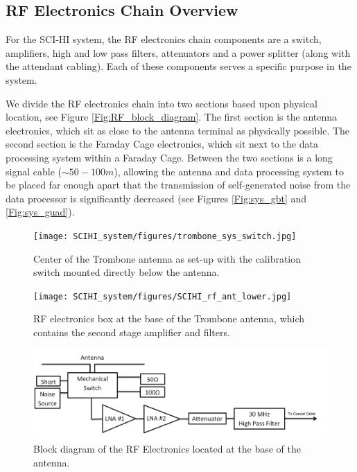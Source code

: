 \subsection{RF Electronics Chain Overview}

For the SCI-HI system, the RF electronics chain components are a switch, amplifiers, high and low pass filters, attenuators and a power splitter (along with the attendant cabling). Each of these components serves a specific purpose in the system. 

We divide the RF electronics chain into two sections based upon physical location, see Figure \ref{Fig:RF_block_diagram}. The first section is the antenna electronics, which sit as close to the antenna terminal as physically possible. The second section is the Faraday Cage electronics, which sit next to the data processing system within a Faraday Cage. Between the two sections is a long signal cable ($\sim50-100 m$), allowing the antenna and data processing system to be placed far enough apart that the transmission of self-generated noise from the data processor is significantly decreased (see Figures \ref{Fig:sys_gbt} and \ref{Fig:sys_guad}).

\begin{figure}[htb]
\centering
\begin{minipage}[b]{0.47\textwidth}
\centering
\texttt{[image: SCIHI\_system/figures/trombone\_sys\_switch.jpg]}
\caption{Center of the Trombone antenna as set-up with the calibration switch mounted directly below the antenna.}
\label{Fig:trombone_switch}
\end{minipage}%
\begin{minipage}[b]{0.02\textwidth}
\hspace{1cm}
\end{minipage}%
\begin{minipage}[b]{0.47\textwidth}
\centering
\texttt{[image: SCIHI\_system/figures/SCIHI\_rf\_ant\_lower.jpg]}
\caption{RF electronics box at the base of the Trombone antenna, which contains the second stage amplifier and filters.}
\label{Fig:trombone_base}
\end{minipage}
\end{figure}

\begin{figure}[htb]
\begin{center}
\includegraphics[width=0.9\linewidth]{SCIHI_system/figures/antenna_rf_block_diagram.png}
\caption{Block diagram of the RF Electronics located at the base of the antenna.}
\label{Fig:antenna_RF_block_diagram}
\end{center}
\end{figure}


